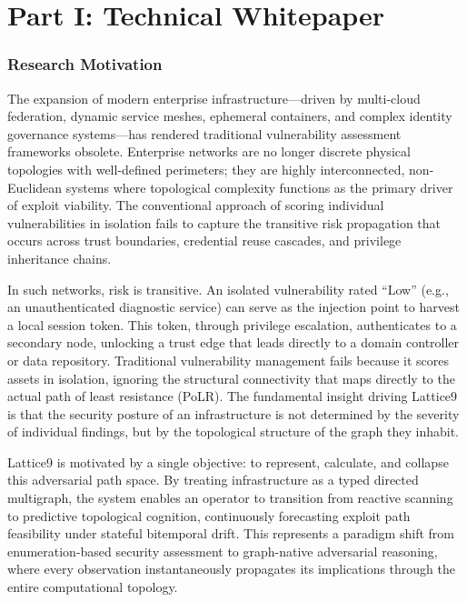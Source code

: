\documentclass[11pt,a4paper]{article}
\theoremstyle{definition}
\numberwithin{equation}{section}
\begin{document}
\tableofcontents
\newpage


\part*{Part I: Technical Whitepaper}

\section{Research Motivation}\label{sec:motivation}

The expansion of modern enterprise infrastructure---driven by multi-cloud federation, dynamic service meshes, ephemeral containers, and complex identity governance systems---has rendered traditional vulnerability assessment frameworks obsolete. Enterprise networks are no longer discrete physical topologies with well-defined perimeters; they are highly interconnected, non-Euclidean systems where topological complexity functions as the primary driver of exploit viability. The conventional approach of scoring individual vulnerabilities in isolation fails to capture the transitive risk propagation that occurs across trust boundaries, credential reuse cascades, and privilege inheritance chains.

In such networks, risk is transitive. An isolated vulnerability rated ``Low'' (e.g., an unauthenticated diagnostic service) can serve as the injection point to harvest a local session token. This token, through privilege escalation, authenticates to a secondary node, unlocking a trust edge that leads directly to a domain controller or data repository. Traditional vulnerability management fails because it scores assets in isolation, ignoring the structural connectivity that maps directly to the actual path of least resistance (PoLR). The fundamental insight driving Lattice9 is that the security posture of an infrastructure is not determined by the severity of individual findings, but by the topological structure of the graph they inhabit.

Lattice9 is motivated by a single objective: to represent, calculate, and collapse this adversarial path space. By treating infrastructure as a typed directed multigraph, the system enables an operator to transition from reactive scanning to predictive topological cognition, continuously forecasting exploit path feasibility under stateful bitemporal drift. This represents a paradigm shift from enumeration-based security assessment to graph-native adversarial reasoning, where every observation instantaneously propagates its implications through the entire computational topology.
\end{document}
